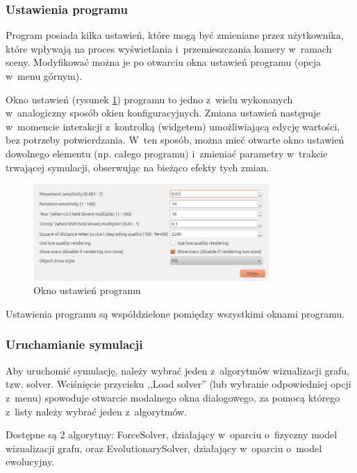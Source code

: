 \documentclass[a4paper,onecolumn,oneside,12pt]{mwart}
\begin{document}
\subsubsection{Ustawienia programu}

Program posiada kilka ustawień, które mogą być zmieniane przez użytkownika,
które wpływają na proces wyświetlania i~przemieszczania kamery w~ramach
sceny. Modyfikować można je po otwarciu okna ustawień programu (opcja
w~menu górnym).

Okno ustawień (rysunek \ref{fig:scr:settings}) programu to jedno z~wielu
wykonanych w~analogiczny sposób okien konfiguracyjnych. Zmiana ustawień
następuje w~momencie interakcji z~kontrolką (widgetem) umożliwiającą edycję
wartości, bez potrzeby potwierdzania. W~ten sposób, można mieć otwarte okno
ustawień dowolnego elementu (np. całego programu) i~zmieniać parametry
w~trakcie trwającej symulacji, obserwując na bieżąco efekty tych zmian.

\begin{figure}[tpb]
	\begin{center}
		\includegraphics[width=0.8\textwidth]{screenshots/settings.png}
	\end{center}
	\caption{Okno ustawień programu}
	\label{fig:scr:settings}
\end{figure}

Ustawienia programu są współdzielone pomiędzy wszystkimi oknami programu.

\subsubsection{Uruchamianie symulacji}

Aby uruchomić symulację, należy wybrać jeden z~algorytmów wizualizacji
grafu, tzw. solver. Wciśnięcie przycisku ,,Load solver'' (lub wybranie
odpowiedniej opcji z~menu) spowoduje otwarcie modalnego okna dialogowego,
za pomocą którego z~listy należy wybrać jeden z~algorytmów.

Dostępne są 2 algorytmy: ForceSolver, działający w~oparciu o~fizyczny model
wizualizacji grafu, oraz EvolutionarySolver, działający w~oparciu o~model
ewolucyjny.
\end{document}
